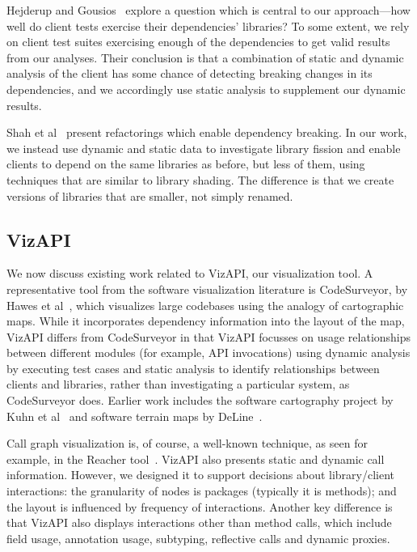 Hejderup and Gousios~\cite{DBLP:journals/jss/HejderupG22} explore a question which is central to our approach---how well do client tests exercise their dependencies' libraries? To some extent, we rely on client test suites exercising enough of the dependencies to get valid results from our analyses. Their conclusion is that a combination of static and dynamic analysis of the client has some chance of detecting breaking changes in its dependencies, and we accordingly use static analysis to supplement our dynamic results.



Shah et al~\cite{shah13:_autom_depen_break_refac_java} present refactorings which enable dependency breaking. In our work, we instead use dynamic and static data to investigate library fission and enable clients to depend on the same libraries as before, but less of them, using techniques that are similar to library shading. The difference is that we create versions of libraries that are smaller, not simply renamed.

\subsection{VizAPI}
\label{sec:related-vizapi}

We now discuss existing work related to VizAPI, our visualization tool.
A representative tool from the software visualization literature is
CodeSurveyor, by Hawes et al~\cite{hawes15:_codes}, which visualizes large
codebases using the analogy of cartographic maps. While it
incorporates dependency information into the layout of the map, VizAPI
differs from CodeSurveyor in that VizAPI focusses on usage relationships
between different modules (for example, API invocations) using dynamic analysis by executing test
cases and static analysis to identify relationships between clients and libraries, rather
than investigating a particular system, as CodeSurveyor does.  Earlier
work includes the software cartography project by Kuhn et
al~\cite{kuhn10:_softw} and software terrain maps by DeLine~\cite{deline05:_stayin}.


Call graph visualization is, of course, a well-known technique, as seen for example, in the Reacher tool~\cite{latoza11:_visual_call_graph}. 
VizAPI also presents static and dynamic call information. However, we designed
it to support decisions about library/client interactions: the granularity of nodes is packages (typically it is methods);
and the layout is influenced by frequency of interactions. Another key difference is that VizAPI also displays interactions other than method calls, which include field usage, annotation usage, subtyping, reflective calls and dynamic proxies.

